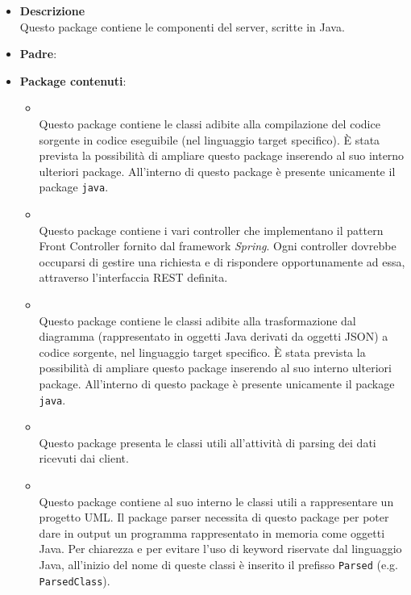 \begin{itemize}
\item \textbf{Descrizione}\\
Questo package contiene le componenti del server, scritte in Java.
\item \textbf{Padre}: \hyperref[\nogloxy{swedesigner}]{}
\item \textbf{Package contenuti}:
\begin{itemize}
\item \hyperref[\nogloxy{swedesigner::server::compiler}]{}\\
Questo package contiene le classi adibite alla compilazione del codice sorgente in codice eseguibile (nel linguaggio target specifico). È stata prevista la possibilità di ampliare questo package inserendo al suo interno ulteriori package. All'interno di questo package è presente unicamente il package \texttt{java}.
\item \hyperref[\nogloxy{swedesigner::server::controller}]{}\\
Questo package contiene i vari controller che implementano il pattern Front Controller fornito dal framework \emph{Spring}. Ogni controller dovrebbe occuparsi di gestire una richiesta e di rispondere opportunamente ad essa, attraverso l'interfaccia REST definita.
\item \hyperref[\nogloxy{swedesigner::server::generator}]{}\\
Questo package contiene le classi adibite alla trasformazione dal diagramma (rappresentato in oggetti Java derivati da oggetti JSON) a codice sorgente, nel linguaggio target specifico. È stata prevista la possibilità di ampliare questo package inserendo al suo interno ulteriori package. All'interno di questo package è presente unicamente il package \texttt{java}.
\item \hyperref[\nogloxy{swedesigner::server::parser}]{}\\
Questo package presenta le classi utili all'attività di parsing dei dati ricevuti dai client.
\item \hyperref[\nogloxy{swedesigner::server::project}]{}\\
Questo package contiene al suo interno le classi utili a rappresentare un progetto UML. Il package parser necessita di questo package per poter dare in output un programma rappresentato in memoria come oggetti Java. Per chiarezza e per evitare l'uso di keyword riservate dal linguaggio Java, all'inizio del nome di queste classi è inserito il prefisso \texttt{Parsed} (e.g. \texttt{ParsedClass}).

\end{itemize}
\end{itemize}
